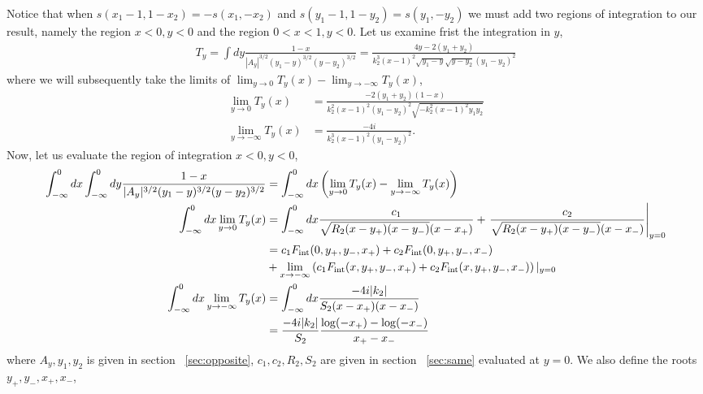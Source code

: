 \documentclass[twoside]{article}
\begin{document}
Notice that when $s(x_1 - 1, 1 - x_2) = -s(x_1, -x_2)$ and $s(y_1 - 1, 1 - y_2) = s(y_1, - y_2)$ we must add two regions of integration to
our result, namely the region $x < 0, y < 0$ and the region $0<x<1, y < 0$. Let us examine frist the integration in $y$,
\begin{align}
  T_y = \int dy\frac{1-x}{|A_y|^{3/2}(y_1 - y)^{3/2}(y - y_2)^{3/2}} = \frac{4y - 2(y_1 + y_2)}{k^3_2(x-1)^2\sqrt{y_1 - y}\sqrt{y - y_2}(y_1 -
  y_2)^2}
\end{align}
where we will subsequently take the limits of $\lim_{y \rightarrow 0}T_y(x) - \lim_{y \rightarrow -\infty}T_y(x)$,
\begin{align}
  \lim_{y \rightarrow 0}T_y(x) &=  \frac{-2(y_1 + y_2)(1 - x)}{k^2_2(x-1)^2(y_1 - y_2)^2\sqrt{-k^2_2(x-1)^2y_1y_2}}\\
  \lim_{y \rightarrow -\infty}T_y(x) &=  \frac{-4i}{k^3_2(x-1)^2(y_1 - y_2)^2}.
\end{align}
Now, let us evaluate the region of integration $x < 0, y < 0$,
\begin{align}
  \int^0_{-\infty}dx\int^0_{-\infty}dy\frac{1-x}{|A_y|^{3/2}(y_1 - y)^{3/2}(y - y_2)^{3/2}} &=  \int^0_{-\infty}dx\left( \lim_{y\rightarrow0}T_y(x) - \lim_{y \rightarrow -\infty}T_y(x) \right)\\
  \int^0_{-\infty}dx\lim_{y \rightarrow 0}T_y(x) &= \int^0_{-\infty}dx  \frac{c_1}{\sqrt{R_2(x - y_+)(x - y_-)}(x - x_+)} +
  \left.\frac{c_2}{\sqrt{R_2(x - y_+)(x - y_-)}(x - x_-)}\right\vert_{y = 0}\\
    &= c_1F_{\rm int}(0, y_+, y_-, x_+) + c_2F_{\rm int}(0, y_+, y_-, x_-) \nonumber \\
    &+\lim_{x \rightarrow -\infty}\left(c_1F_{\rm int}(x,y_+,y_-,x_+) + c_2F_{\rm int}(x, y_+,y_-,x_-)\right)\vert_{y = 0}\\
    \int^{0}_{-\infty}dx \lim_{y \rightarrow -\infty}T_y(x) &= \int^0_{-\infty}dx \frac{-4i|k_2|}{S_2(x-x_+)(x-x_-)}\\
    &= \frac{-4i|k_2|}{S_2}\frac{\log(-x_+) - \log(-x_-)}{x_+ - x_-}
\end{align}
where $A_y, y_1, y_2$ is given in section ~\ref{sec:opposite}, $c_1, c_2, R_2, S_2$ are given in section ~\ref{sec:same} evaluated at
$y = 0$. We also define the roots $y_+,y_-, x_+,x_-$,
\end{document}
